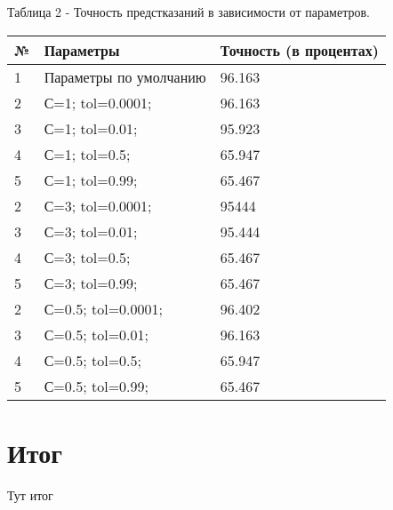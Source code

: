 \documentclass[a4paper,12pt]{article}
\begin{document}
	\vspace{0.5cm}
	Таблица 2 - Точность предстказаний в зависимости от параметров.
\begin{longtable}{|p{1cm}|p{9cm}|p{3cm}|}
\hline 
№ & Параметры & Точность (в процентах) \\ 
\hline 
1 & Параметры по умолчанию & 96.163 \\
\hline
2 & С=1; tol=0.0001; & 96.163 \\
\hline 
3 & С=1; tol=0.01; & 95.923 \\
\hline 
4 &  С=1; tol=0.5;  & 65.947 \\
\hline 
5 & С=1; tol=0.99;  & 65.467 \\
\hline
2 & С=3; tol=0.0001; & 95444 \\
\hline 
3 & С=3; tol=0.01; & 95.444 \\
\hline 
4 &  С=3; tol=0.5;  & 65.467 \\
\hline 
5 & С=3; tol=0.99;  & 65.467 \\
\hline
2 & С=0.5; tol=0.0001; & 96.402 \\
\hline 
3 & С=0.5; tol=0.01; & 96.163 \\
\hline 
4 & С=0.5; tol=0.5;  & 65.947 \\
\hline 
5 & С=0.5; tol=0.99;  & 65.467 \\
\hline 
\end{longtable}


\newpage\section{Итог}
	Тут итог
	
	
\end{document}
